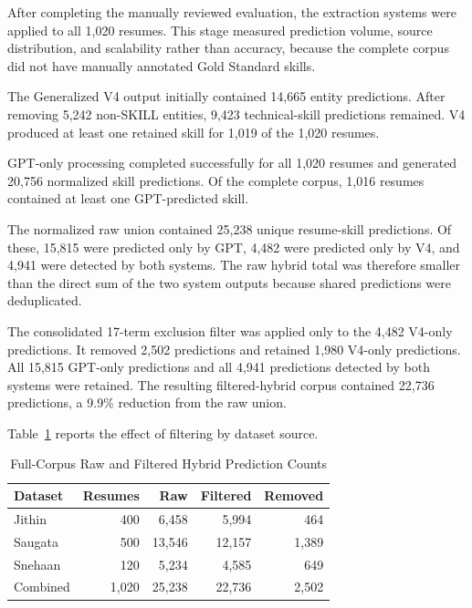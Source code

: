 \documentclass[conference]{IEEEtran}
\begin{document}
After completing the manually reviewed evaluation, the extraction systems
were applied to all 1,020 resumes. This stage measured prediction volume,
source distribution, and scalability rather than accuracy, because the
complete corpus did not have manually annotated Gold Standard skills.

The Generalized V4 output initially contained 14,665 entity predictions.
After removing 5,242 non-SKILL entities, 9,423 technical-skill
predictions remained. V4 produced at least one retained skill for 1,019
of the 1,020 resumes.

GPT-only processing completed successfully for all 1,020 resumes and
generated 20,756 normalized skill predictions. Of the complete corpus,
1,016 resumes contained at least one GPT-predicted skill.

The normalized raw union contained 25,238 unique resume-skill
predictions. Of these, 15,815 were predicted only by GPT, 4,482 were
predicted only by V4, and 4,941 were detected by both systems. The raw
hybrid total was therefore smaller than the direct sum of the two system
outputs because shared predictions were deduplicated.

The consolidated 17-term exclusion filter was applied only to the 4,482
V4-only predictions. It removed 2,502 predictions and retained 1,980
V4-only predictions. All 15,815 GPT-only predictions and all 4,941
predictions detected by both systems were retained. The resulting
filtered-hybrid corpus contained 22,736 predictions, a 9.9\% reduction
from the raw union.

Table~\ref{tab:full_corpus_counts} reports the effect of filtering by
dataset source.

\begin{table}[t]
\caption{Full-Corpus Raw and Filtered Hybrid Prediction Counts}
\label{tab:full_corpus_counts}
\centering
\footnotesize
\setlength{\tabcolsep}{3.0pt}
\begin{tabular}{lrrrr}
\toprule
Dataset & Resumes & Raw & Filtered & Removed \\
\midrule
Jithin & 400 & 6,458 & 5,994 & 464 \\
Saugata & 500 & 13,546 & 12,157 & 1,389 \\
Snehaan & 120 & 5,234 & 4,585 & 649 \\
\midrule
Combined & 1,020 & 25,238 & 22,736 & 2,502 \\
\bottomrule
\end{tabular}
\end{table}
\end{document}
